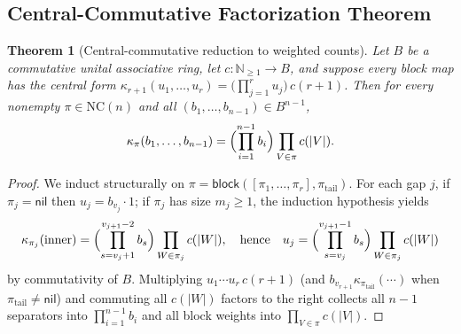 \documentclass[11pt,a4paper]{article}
\newtheorem{theorem}{Theorem}[section]
\theoremstyle{definition}
\newcommand{\NC}{\mathrm{NC}}
\begin{document}
\subsection{Central-Commutative Factorization Theorem}
\begin{theorem}[Central-commutative reduction to weighted counts]\label{thm:central}
Let $B$ be a commutative unital associative ring, let $c \colon \mathbb{N}_{\ge 1} \to B$, and suppose every block map has the central form $\kappa_{r+1}(u_1, \dots, u_r) = \bigl(\prod_{j=1}^r u_j\bigr)\, c(r + 1)$. Then for every nonempty $\pi \in \NC(n)$ and all $(b_1, \dots, b_{n-1}) \in B^{n-1}$,
\[
\kappa_\pi(b_1, \dots, b_{n-1}) = \Bigl(\prod_{i=1}^{n-1} b_i\Bigr) \prod_{V \in \pi} c(|V|).
\]
\end{theorem}
\begin{proof}
We induct structurally on $\pi = \mathsf{block}([\pi_1, \dots, \pi_r], \pi_{\mathrm{tail}})$. For each gap $j$, if $\pi_j = \mathsf{nil}$ then $u_j = b_{v_j} \cdot 1$; if $\pi_j$ has size $m_j \ge 1$, the induction hypothesis yields
\[
\kappa_{\pi_j}(\text{inner}) = \Bigl(\prod_{s=v_j+1}^{v_{j+1}-2} b_s\Bigr) \prod_{W \in \pi_j} c(|W|), \quad\text{hence}\quad u_j = \Bigl(\prod_{s=v_j}^{v_{j+1}-1} b_s\Bigr) \prod_{W \in \pi_j} c(|W|)
\]
by commutativity of $B$. Multiplying $u_1 \cdots u_r \, c(r+1)$ (and $b_{v_{r+1}} \kappa_{\pi_{\mathrm{tail}}}(\cdots)$ when $\pi_{\mathrm{tail}} \neq \mathsf{nil}$) and commuting all $c(|W|)$ factors to the right collects all $n - 1$ separators into $\prod_{i=1}^{n-1} b_i$ and all block weights into $\prod_{V \in \pi} c(|V|)$.
\end{proof}
\end{document}
